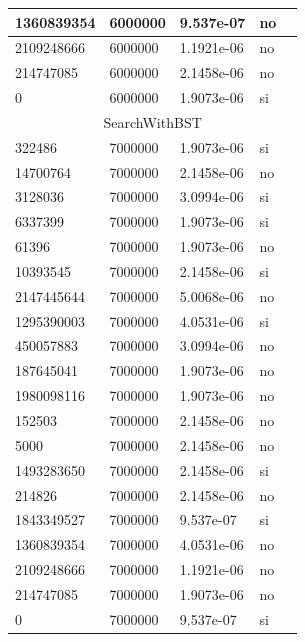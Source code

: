 \documentclass[12pt, fleqn]{article}                             %
\theoremstyle{break}                                            %
\begin{document}
\begin{longtable}{|m{5em}|m{5em}|m{10em}|m{5em}|@{}m{0pt}@{}}
            1360839354& 6000000  & 9.537e-07 & no &\\[1em]    \hline
            2109248666& 6000000  & 1.1921e-06 & no &\\[1em]    \hline
            214747085& 6000000  & 2.1458e-06 & no &\\[1em]    \hline
            0& 6000000  & 1.9073e-06 & si &\\[1em]    \hline
            \multicolumn{5}{|c|}{SearchWithBST}   \\          \hline
            322486& 7000000  & 1.9073e-06 & si &\\[1em]    \hline
            14700764& 7000000  & 2.1458e-06 & no &\\[1em]    \hline
            3128036& 7000000  & 3.0994e-06 & si &\\[1em]    \hline
            6337399& 7000000  & 1.9073e-06 & si &\\[1em]    \hline
            61396& 7000000  & 1.9073e-06 & no &\\[1em]    \hline
            10393545& 7000000  & 2.1458e-06 & si &\\[1em]    \hline
            2147445644& 7000000  & 5.0068e-06 & no &\\[1em]    \hline
            1295390003& 7000000  & 4.0531e-06 & si &\\[1em]    \hline
            450057883& 7000000  & 3.0994e-06 & no &\\[1em]    \hline
            187645041& 7000000  & 1.9073e-06 & no &\\[1em]    \hline
            1980098116& 7000000  & 1.9073e-06 & no &\\[1em]    \hline
            152503& 7000000  & 2.1458e-06 & no &\\[1em]    \hline
            5000& 7000000  & 2.1458e-06 & no &\\[1em]    \hline
            1493283650& 7000000  & 2.1458e-06 & si &\\[1em]    \hline
            214826& 7000000  & 2.1458e-06 & no &\\[1em]    \hline
            1843349527& 7000000  & 9.537e-07 & si &\\[1em]    \hline
            1360839354& 7000000  & 4.0531e-06 & no &\\[1em]    \hline
            2109248666& 7000000  & 1.1921e-06 & no &\\[1em]    \hline
            214747085& 7000000  & 1.9073e-06 & no &\\[1em]    \hline
            0& 7000000  & 9.537e-07 & si &\\[1em]    \hline

\end{longtable}
\end{document}
